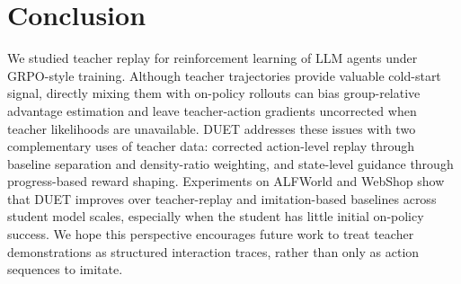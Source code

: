 
\section{Conclusion}
\label{sec:conclusion}

We studied teacher replay for reinforcement learning of LLM agents under GRPO-style training. 
Although teacher trajectories provide valuable cold-start signal, directly mixing them with on-policy rollouts can bias group-relative advantage estimation and leave teacher-action gradients uncorrected when teacher likelihoods are unavailable. 
DUET addresses these issues with two complementary uses of teacher data: corrected action-level replay through baseline separation and density-ratio weighting, and state-level guidance through progress-based reward shaping. 
Experiments on ALFWorld and WebShop show that DUET improves over teacher-replay and imitation-based baselines across student model scales, especially when the student has little initial on-policy success. 
We hope this perspective encourages future work to treat teacher demonstrations as structured interaction traces, rather than only as action sequences to imitate.